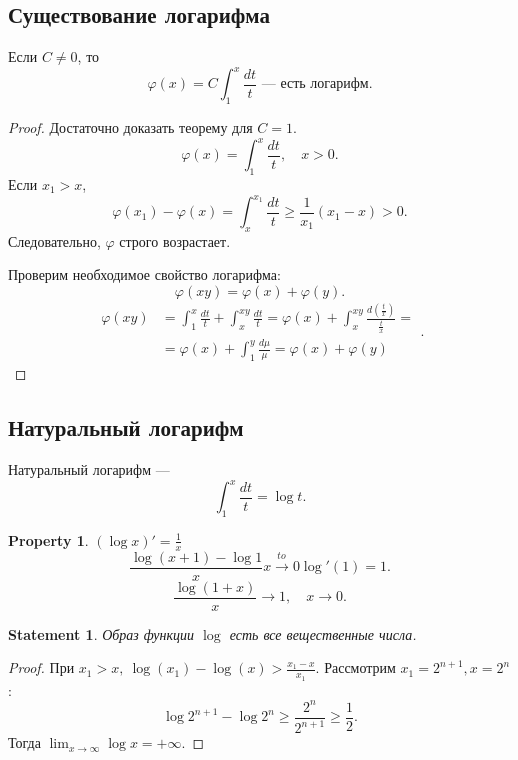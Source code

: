 \documentclass[11pt]{book}
\renewcommand{\ge}{\geqslant}
\theoremstyle{definition}
\theoremstyle{plain}
\theoremstyle{plain}
\newtheorem*{st}{Statement}
\newtheorem*{prop}{Property}
\theoremstyle{definition}
\theoremstyle{remark}
\begin{document}
\subsection{Существование логарифма}
\begin{thm}
    Если $ C \ne 0$, то \[
	\varphi (x) = C\int_1 ^{x} \frac{dt}{t} \text{ --- есть логарифм}
    .\]
\end{thm}
\begin{proof}
    Достаточно доказать теорему для $ C=1$.
    \[
	\varphi (x) = \int_1^{x} \frac{dt}{t},\quad x>0
    .\]
    Если $ x_1>x$,
    \[
	\varphi (x_1) - \varphi (x) = \int_x^{x_1} \frac{dt}{t} \ge  \frac{1}{x_1} (x_1-x) > 0
    .\]
    Следовательно, $  \varphi $ строго возрастает.

    Проверим необходимое свойство логарифма:
    \[
	\varphi (xy) = \varphi (x) + \varphi (y)
    .\]
    \[
	\begin{aligned}
	    \varphi (xy) &= \int_1 ^{x} \frac{dt}{t} +\int_x ^{xy} \frac{dt}{t} = \varphi  (x) +  \int_x ^{xy} \frac{d(\frac{t}{x})}{\frac{t}{x}} = \\
			 & = \varphi (x) + \int_1 ^{y} \frac{d \mu}{\mu} = \varphi (x) + \varphi (y) 
	\end{aligned}
    .\]
\end{proof}
\subsection{Натуральный логарифм}
\begin{defn}
    Натуральный логарифм ---
    \[
	\int_1^{x} \frac{dt}{t} = \log t
    .\]
\end{defn}
\begin{prop}
    $ (\log x)' = \frac{1}{x}$
    \[
	\frac{\log (x+1) - \log 1}{x} \stackrel{to} {x \to  0} \log'(1) = 1
    .\]
    \[
	\frac{\log(1+x)}{x} \to 1, \quad x \to  0
    .\]
\end{prop}
\begin{st}
    Образ функции $ \log$ есть все вещественные числа.
\end{st}
\begin{proof}
    При $ x_1>x, ~ \log(x_1) - \log(x) > \frac{x_1-x}{x_1}$.
    Рассмотрим $ x_1 = 2^{n+1}, x = 2^{n}$ :
    \[
	\log 2 ^{n+1} - \log 2^{n} \ge  \frac{2^{n}}{2^{n+1}} \ge \frac{1}{2}
    .\]
    Тогда $ \lim_{x \to  \infty} \log x = + \infty$.
\end{proof}
\end{document}
